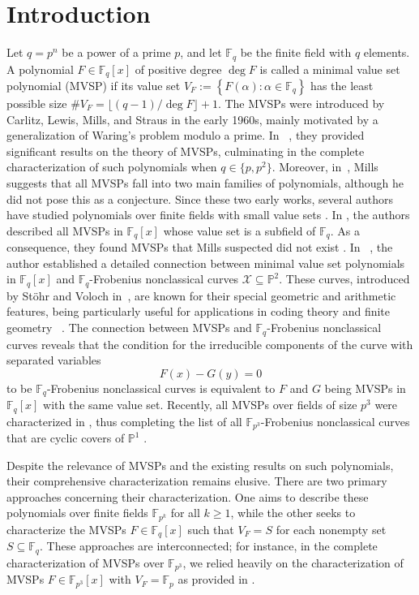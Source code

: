 \documentclass[11pt]{amsart}
\theoremstyle{definition}
\theoremstyle{remark}
\begin{document}
\section{Introduction}
Let $q=p^n$ be a power of a prime $p$, and let $\mathbb{F}_q$ be the finite field with $q$ elements. A polynomial $F \in \mathbb{F}_q[x]$ of positive degree $\operatorname{deg} F$ is called a minimal value set polynomial (MVSP) if its value set $V_F:=\left\{F(\alpha): \alpha \in \mathbb{F}_q\right\}$ has the least possible size $\# V_F=\lfloor(q-1) / \operatorname{deg} F\rfloor+1$. The MVSPs were introduced by Carlitz, Lewis, Mills, and Straus in the early 1960s, mainly motivated by a generalization of Waring's problem modulo a prime. In  ~\cite{Carlitz, Mills}, they provided significant results on the theory of MVSPs, culminating in the complete characterization of such polynomials when $q\in \{p, p^2\}$. Moreover,  in~\cite{Mills}, Mills suggests that all MVSPs fall into two main families of polynomials, although he did not pose this as a conjecture. Since these two early works, several authors have studied polynomials over finite fields with small value sets \cite{Bor2,Cald1,Cald2,WSC}. 
In \cite{Bor2},  the authors described all MVSPs in $\mathbb{F}_q[x]$ whose value set is a subfield of $\mathbb{F}_q$. As a consequence, they found MVSPs that Mills suspected did not exist \cite[Section $6$]{Bor2}. In ~\cite{Bor0}, the author established  a detailed  connection between minimal value set polynomials in $\mathbb{F}_q[x]$ and   $\mathbb{F}_q$-Frobenius nonclassical curves $\mathcal{X} \subseteq \mathbb{P}^2$. These curves, introduced by St\"ohr and Voloch in~\cite{SV},  are known for their special geometric and arithmetic features, being particularly useful for applications in coding theory and finite geometry ~\cite{Bor1,Bor3}. The connection between MVSPs and $\mathbb{F}_q$-Frobenius nonclassical curves reveals that the condition for the irreducible components of the curve with separated variables
$$
F(x)-G(y)=0
$$
to be $\mathbb{F}_q$-Frobenius nonclassical curves is equivalent to $F$ and $G$ being MVSPs in $\mathbb{F}_q[x]$ with the same value set. Recently, all MVSPs over fields of size $p^3$ were characterized in \cite{BR}, thus  completing  the  list of all $\mathbb{F}_{p^{3}}$-Frobenius nonclassical curves that are cyclic covers of $\mathbb{P}^1$ .

Despite the relevance of MVSPs and the existing results on such polynomials, their comprehensive characterization remains elusive. There are two primary approaches concerning their characterization. One aims to describe these polynomials over finite fields $\mathbb{F}_{p^k}$ for all $k \geq 1$, while the other seeks to characterize the MVSPs $F \in \mathbb{F}_q[x]$ such that $V_F=S$  for each nonempty set $S \subseteq \mathbb{F}_q$.  These approaches are interconnected; for instance, in the complete characterization of MVSPs over  $\mathbb{F}_{p^3}$, we  relied heavily on the characterization of MVSPs $F \in \mathbb{F}_{p^3}[x]$ with $V_F=\mathbb{F}_p$ as provided in \cite{Bor2}.
\end{document}
